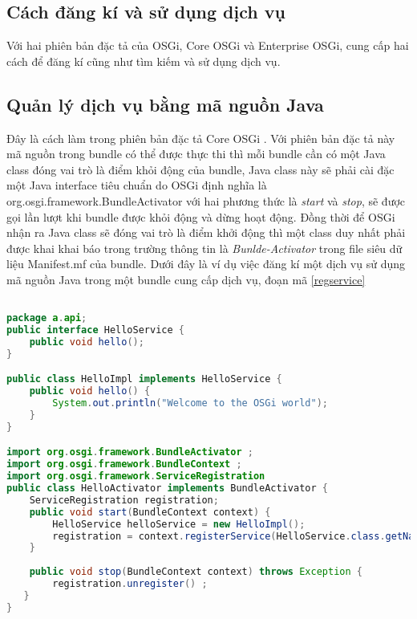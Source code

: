 \subsection{Cách đăng kí và sử dụng dịch vụ}
Với hai phiên bản đặc tả của OSGi, Core OSGi và Enterprise OSGi, cung cấp hai cách để đăng kí cũng như tìm kiếm và sử dụng dịch vụ.
\subsection{Quản lý dịch vụ bằng mã nguồn Java}
Đây là cách làm trong phiên bản đặc tả Core OSGi \cite{osgicore5}. Với phiên bản đặc tả này mã nguồn trong bundle có thể được thực thi thì mỗi bundle cần có một Java class đóng vai trò là điểm khỏi động của bundle, Java class này sẽ phải cài đặc một Java interface tiêu chuẩn do OSGi định nghĩa là org.osgi.framework.BundleActivator với hai phương thức là \textit{start} và \textit{stop}, sẽ được gọi lần lượt khi bundle được khỏi động và dừng hoạt động.
Đồng thời để OSGi nhận ra Java class sẽ đóng vai trò là điểm khởi động thì một class duy nhất phải được khai khai báo trong trường thông tin là \textit{Bunlde-Activator} trong file siêu dữ liệu Manifest.mf của bundle.
Dưới đây là ví dụ việc đăng kí một dịch vụ sử dụng mã nguồn Java trong một bundle cung cấp dịch vụ, đoạn mã \ref{regservice}

\begin{lstlisting}[label=regservice, 
inputencoding=utf8,
breaklines=true,
language=Java,
basicstyle=\ttfamily\footnotesize,
caption=Đăng kí một dịch vụ dùng mã Java]

package a.api;
public interface HelloService {
    public void hello();
}

public class HelloImpl implements HelloService {
    public void hello() {
        System.out.println("Welcome to the OSGi world");
    }
}

import org.osgi.framework.BundleActivator ;
import org.osgi.framework.BundleContext ;
import org.osgi.framework.ServiceRegistration
public class HelloActivator implements BundleActivator {
    ServiceRegistration registration;
    public void start(BundleContext context) {
        HelloService helloService = new HelloImpl();
        registration = context.registerService(HelloService.class.getName(), helloService, null);
    }
		
    public void stop(BundleContext context) throws Exception {
        registration.unregister() ;
   }
}
\end{lstlisting}

